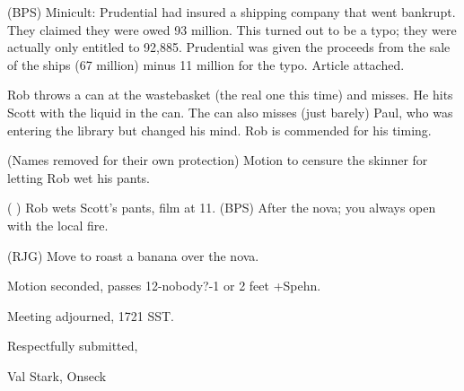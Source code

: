 \documentclass[12pt]{article}
\begin{document}
(BPS) Minicult: Prudential had insured a shipping company that went bankrupt. They claimed they were owed 93 million. This turned out to be a typo; they were actually only entitled to 92,885. Prudential was given the proceeds from the sale of the ships (67 million) minus 11 million for the typo. Article attached.

Rob throws a can at the wastebasket (the real one this time) and misses. He hits Scott with the liquid in the can. The can also misses (just barely) Paul, who was entering the library but changed his mind. Rob is commended for his timing.

(Names removed for their own protection) Motion to censure the skinner for letting Rob wet his pants.

( ) Rob wets Scott's pants, film at 11. (BPS) After the nova; you always open with the local fire.

(RJG) Move to roast a banana over the nova.

Motion seconded, passes 12-nobody?-1 or 2 feet +Spehn.

\vspace{12pt}

\noindent
Meeting adjourned, 1721 SST.

\vspace{18pt}

\centerline{Respectfully submitted,}
\centerline{Val Stark, Onseck}
\end{document}
